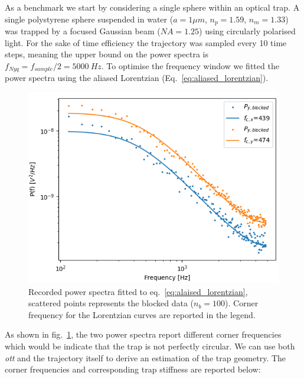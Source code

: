 As a benchmark we start by considering a single sphere within an 
optical trap. A single polystyrene sphere suspended in water 
($a=1\mu m$, $n_p=1.59$, $n_m=1.33$) was trapped by a focused 
Gaussian beam ($NA=1.25$) using circularly polarised light. For 
the sake of time efficiency the trajectory was sampled every 10
time steps, meaning the upper bound on the power spectra is
$f_{Nyq}=f_{sample}/2=5000\ Hz$. To optimise the frequency window
we fitted the power spectra using the aliased Lorentzian 
(Eq.~\eqref{eq:aliased_lorentzian}).
\begin{figure}[h]
	\centering
	\includegraphics[width=\linewidth]{PSD_sphere.png}
	\caption{Recorded power spectra fitted to eq.~\ref{eq:alaised_lorentzian},
		 scattered points represents the blocked data ($n_b=100$). Corner 
		 frequency for the Lorentzian curves are reported in the legend.}
	\label{fig:psd_sphere}
\end{figure} 

As shown in fig.~\ref{fig:psd_sphere}, the two power spectra report 
different corner frequencies which would be indicate that the trap 
is not perfectly circular. We can use both \textit{ott} and the 
trajectory itself to derive an estimation of the trap geometry. 
The corner frequencies and corresponding trap stiffness are 
reported below:
\newpage

